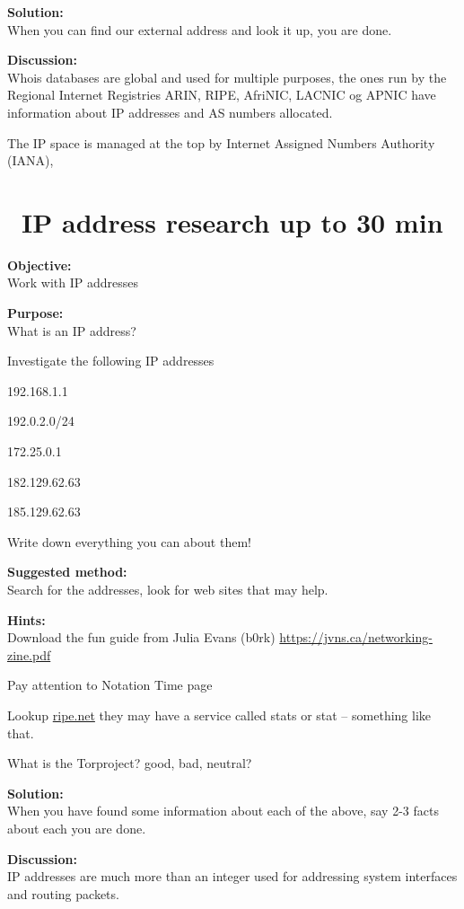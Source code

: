 \documentclass[a4paper,11pt,notitlepage]{report}
\begin{document}
{\bf Solution:}\\
When you can find our external address and look it up, you are done.

{\bf Discussion:}\\
Whois databases are global and used for multiple purposes, the ones run by the Regional Internet Registries ARIN, RIPE, AfriNIC, LACNIC og APNIC have information about IP addresses and AS numbers allocated.

The IP space is managed at the top by  Internet Assigned Numbers Authority (IANA),

\chapter{\faInfoCircle\ IP address research up to 30 min}
\label{ex:ip-address-research}

{\bf Objective:}\\
Work with IP addresses

{\bf Purpose:}\\
What is an IP address?

Investigate the following IP addresses
\begin{list2}
\item 192.168.1.1
\item 192.0.2.0/24
\item 172.25.0.1
\item 182.129.62.63
\item 185.129.62.63
\end{list2}

Write down everything you can about them!

{\bf Suggested method:}\\
Search for the addresses, look for web sites that may help.

{\bf Hints:}\\
Download the fun guide from Julia Evans (b0rk) \url{https://jvns.ca/networking-zine.pdf}

Pay attention to Notation Time page

Lookup \url{ripe.net} they may have a service called stats or stat -- something like that.

What is the Torproject? good, bad, neutral?

{\bf Solution:}\\
When you have found some information about each of the above, say 2-3 facts about each you are done.

{\bf Discussion:}\\
IP addresses are much more than an integer used for addressing system interfaces and routing packets.
\end{document}
